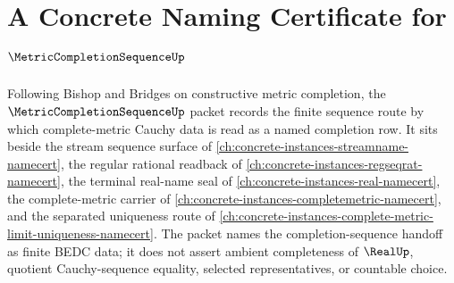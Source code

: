 \chapter{A Concrete Naming Certificate for $\MetricCompletionSequenceUp$}
\label{ch:concrete-instances-metric-completion-sequence-namecert}

Following Bishop and Bridges on constructive metric completion, the $\MetricCompletionSequenceUp$ packet records the finite sequence route by which complete-metric Cauchy data is read as a named completion row. It sits beside the stream sequence surface of \autoref{ch:concrete-instances-streamname-namecert}, the regular rational readback of \autoref{ch:concrete-instances-regseqrat-namecert}, the terminal real-name seal of \autoref{ch:concrete-instances-real-namecert}, the complete-metric carrier of \autoref{ch:concrete-instances-completemetric-namecert}, and the separated uniqueness route of \autoref{ch:concrete-instances-complete-metric-limit-uniqueness-namecert}. The packet names the completion-sequence handoff as finite BEDC data; it does not assert ambient completeness of $\RealUp$, quotient Cauchy-sequence equality, selected representatives, or countable choice.

